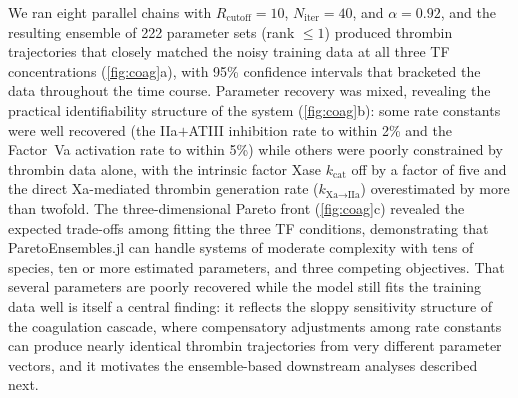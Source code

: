 \documentclass[preprint,review,12pt]{elsarticle}
\begin{document}
We ran eight parallel chains with $R_{\text{cutoff}} = 10$, $N_{\text{iter}} = 40$, and $\alpha = 0.92$, and the resulting ensemble of 222 parameter sets (rank $\leq 1$) produced thrombin trajectories that closely matched the noisy training data at all three TF concentrations (\cref{fig:coag}a), with 95\% confidence intervals that bracketed the data throughout the time course.
Parameter recovery was mixed, revealing the practical identifiability structure of the system (\cref{fig:coag}b): some rate constants were well recovered (the IIa$+$ATIII inhibition rate to within 2\% and the Factor~Va activation rate to within 5\%) while others were poorly constrained by thrombin data alone, with the intrinsic factor Xase $k_{\text{cat}}$ off by a factor of five and the direct Xa-mediated thrombin generation rate ($k_{\text{Xa} \to \text{IIa}}$) overestimated by more than twofold.
The three-dimensional Pareto front (\cref{fig:coag}c) revealed the expected trade-offs among fitting the three TF conditions, demonstrating that ParetoEnsembles.jl can handle systems of moderate complexity with tens of species, ten or more estimated parameters, and three competing objectives.
That several parameters are poorly recovered while the model still fits the training data well is itself a central finding: it reflects the sloppy sensitivity structure of the coagulation cascade, where compensatory adjustments among rate constants can produce nearly identical thrombin trajectories from very different parameter vectors, and it motivates the ensemble-based downstream analyses described next.
\end{document}
